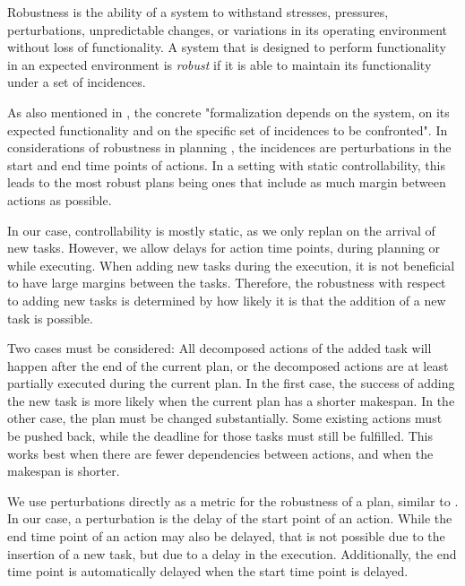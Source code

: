 \begin{definition}[Robustness]
    Robustness is the ability of a system to withstand stresses, pressures, perturbations, unpredictable changes, or variations in its operating environment without loss of functionality.
    A system that is designed to perform functionality in an expected environment is \emph{robust} if it is able to maintain its functionality under a set of incidences. \citep{barberRobustnessStabilityRecoverability2015}
\end{definition}

As also mentioned in \cite{barberRobustnessStabilityRecoverability2015}, the concrete "formalization depends on the system, on its expected functionality and on the specific set of incidences to be confronted".
In considerations of robustness in planning \citep{lundRobustExecutionProbabilistic2017}, the incidences are perturbations in the start and end time points of actions.
In a setting with static controllability, this leads to the most robust plans being ones that include as much margin between actions as possible.

In our case, controllability is mostly static, as we only replan on the arrival of new tasks.
However, we allow delays for action time points, during planning or while executing.
When adding new tasks during the execution, it is not beneficial to have large margins between the tasks.
Therefore, the robustness with respect to adding new tasks is determined by how likely it is that the addition of a new task is possible.

Two cases must be considered: All decomposed actions of the added task will happen after the end of the current plan, or the decomposed actions are at least partially executed during the current plan.
In the first case, the success of adding the new task is more likely when the current plan has a shorter makespan.
In the other case, the plan must be changed substantially.
Some existing actions must be pushed back, while the deadline for those tasks must still be fulfilled.
This works best when there are fewer dependencies between actions, and when the makespan is shorter.

We use perturbations directly as a metric for the robustness of a plan, similar to \cite{wehnerRobustVsFast2023}.
In our case, a perturbation is the delay of the start point of an action.
While the end time point of an action may also be delayed, that is not possible due to the insertion of a new task, but due to a delay in the execution.
Additionally, the end time point is automatically delayed when the start time point is delayed.

